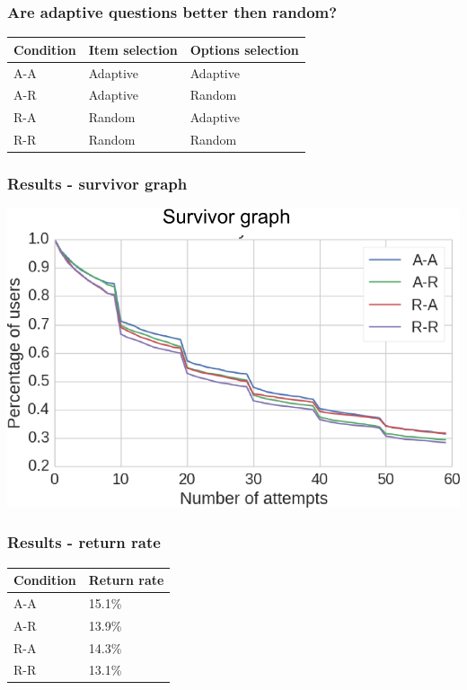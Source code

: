 \documentclass[xcolor=svgnames]{beamer}
\begin{document}
\begin{frame}
  \frametitle{Are adaptive questions better then random?}
\begin{center} 
\begin{table}[tbh]
  \centering
  \begin{tabular}{lll}
    \toprule
    Condition & Item selection & Options selection \\
    \midrule
    A-A & Adaptive & Adaptive \\
    A-R & Adaptive & Random \\
    R-A & Random & Adaptive \\
    R-R & Random & Random \\
    \bottomrule
  \end{tabular}
\end{table}
\end{center}
\end{frame}
\begin{frame}
	\frametitle{Results - survivor graph}
   \includegraphics[width=\textwidth]{img/survivor-hack-raw.png}
\end{frame}
\begin{frame}
	\frametitle{Results - return rate}
\begin{table}
  \centering
  \label{tab:return-prob}
  \begin{tabular}{ll}
    \toprule
    Condition & Return rate \\
    \midrule
    A-A & 	15.1\% \\
    A-R & 	13.9\% \\
    R-A & 	14.3\% \\
    R-R & 	13.1\% \\
    \bottomrule
  \end{tabular}
\end{table}
\end{frame}
\end{document}
